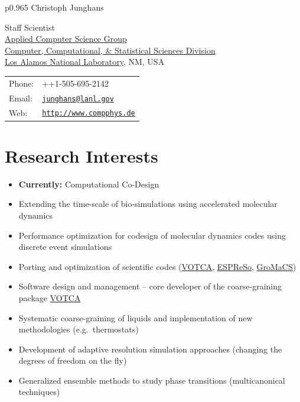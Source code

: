 \documentclass{article}
\begin{document}
\thispagestyle{plain}
\vspace*{-1.2cm}

\begin{tabular}{p{0.965\textwidth}}
{\huge Christoph Junghans}\\
\hline
\end{tabular}
\vspace{0.2in}

\begin{minipage}{0.55\linewidth}
  Staff Scientist\\ 
  \href{http://www.ccs.lanl.gov/ccs7.shtml} {Applied Computer Science Group}\\
  \href{http://www.ccs.lanl.gov/} {Computer, Computational, \& Statistical Sciences Division}\\
  \href{http://www.lanl.gov}{Los Alamos National Laboratory}, NM, USA
\end{minipage}
\begin{minipage}{0.45\linewidth}
  \begin{tabular}{ll}
    Phone: & ++1-505-695-2142 \\
    Email: & \href{mailto:junghans@lanl.gov}{\tt junghans@lanl.gov} \\
    Web: & \href{http://www.compphys.de}{\tt http://www.compphys.de} \\
  \end{tabular}
\end{minipage}

\section*{Research Interests}
\begin{itemize}
\setlength{\itemsep}{0pt}
\setlength{\parskip}{0pt}
\setlength{\parsep}{0pt}
\item \textbf{Currently:} Computational Co-Design 
\item Extending the time-scale of bio-simulations using accelerated molecular dynamics
\item Performance optimization for codesign of molecular dynamics codes using discrete event simulations
\item Porting and optimization of scientific codes (\href{http://www.votca.org}{VOTCA}, \href{http://www.espressomd.org}{ESPReSo}, \href{http://www.gromacs.org}{GroMaCS})
\item Software design and management -- core developer of the coarse-graining package \href{http://www.votca.org}{VOTCA}
\item Systematic coarse-graining of liquids and implementation of new methodologies (e.g.\ thermostats)
\item Development of adaptive resolution simulation approaches (changing the degrees of freedom on the fly)
\item Generalized ensemble methods to study phase transitions (multicanonical techniques)
\end{itemize}
\end{document}
